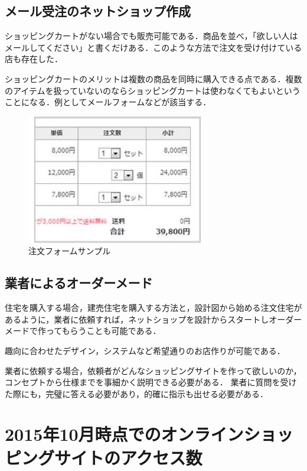 \subsection{メール受注のネットショップ作成}

ショッピングカートがない場合でも販売可能である．商品を並べ，「欲しい人はメールしてください」と書くだけある．このような方法で注文を受け付けている店も存在した．

ショッピングカートのメリットは複数の商品を同時に購入できる点である．複数のアイテムを扱っていないのならショッピングカートは使わなくてもよいということになる．例としてメールフォームなどが該当する．

\begin{figure}[htbp]

\centering
\includegraphics[width=8cm,clip]{fromsample.pdf}
\caption{注文フォームサンプル}
\label{fromsample}

\end{figure} 



\subsection{業者によるオーダーメード}

住宅を購入する場合，建売住宅を購入する方法と，設計図から始める注文住宅があるように，業者に依頼すれば，ネットショップを設計からスタートしオーダーメードで作ってもらうことも可能である．

趣向に合わせたデザイン，システムなど希望通りのお店作りが可能である．

業者に依頼する場合，依頼者がどんなショッピングサイトを作って欲しいのか，コンセプトから仕様までを事細かく説明できる必要がある．
業者に質問を受けた際にも，完璧に答える必要があり，的確に指示も出せる必要がある．



\section{2015年10月時点でのオンラインショッピングサイトのアクセス数}

